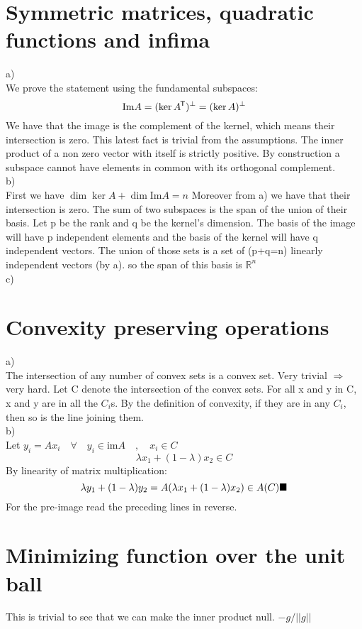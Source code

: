 \documentclass{article}
\newcommand*{\tran}{^{\mkern-1.5mu\mathsf{T}}}%
\begin{document}
	\section{Symmetric matrices, quadratic functions and infima}
	a)\\
	We prove the statement using the fundamental subspaces:
	\begin{equation}
		\text{Im}A = (\ker A\tran)^\bot = (\ker A)^\bot
	\end{equation}
	We have that the image is the complement of the kernel, which means their intersection is zero. This latest fact is trivial from the assumptions. The inner product of a non zero vector with itself is strictly positive. By construction a subspace cannot have elements in common with its orthogonal complement. \\
	b)\\
	First we have $\dim \ker A + \dim \text{Im} A = n$
	Moreover from a) we have that their intersection is zero. The sum of two subspaces is the span of the union of their basis. Let p be the rank and q be the kernel's dimension. The basis of the image will have p independent elements and the basis of the kernel will have q independent vectors. The union  of those sets is a set of (p+q=n) linearly independent vectors (by a).  so the span of this basis is $\mathbb{R}^n $\\ 
	c)
	
	\clearpage
	\section{Convexity preserving operations}
	a)\\
	The intersection of any number of convex sets is a convex set. Very trivial $\Rightarrow$ very hard. Let C denote the intersection of the convex sets. For all x and y in C, x and y are in all the $C_i$s. By the definition of convexity, if they are in any $C_i$, then so is the line joining them.\\
	b)\\
	Let $y_i = Ax_i \quad \forall \quad y_i \in \text{im}A \quad , \quad x_i \in C$
	\begin{equation*}
		\lambda x_1 + (1-\lambda)x_2 \in C
	\end{equation*}
	By linearity of matrix multiplication:
	\begin{equation*}
		\lambda y_1 + (1-\lambda)y_2 = A(\lambda x_1 + (1-\lambda)x_2) \in A(C)\\ 
		\blacksquare 
	\end{equation*}
	For the pre-image read the preceding lines in reverse.
	
	\section{Minimizing function over the unit ball}
	This is trivial to see that we can make the inner product null.
	$-g/\vert \vert g \vert \vert$
	
	
	
	

	
\end{document}
